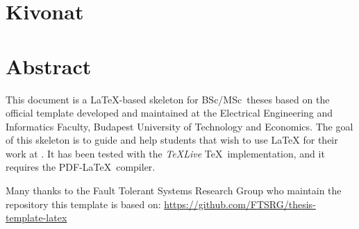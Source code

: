 \setcounter{page}{1}

\selecthungarian

\chapter*{Kivonat}

\vfill
\selectenglish


\chapter*{Abstract}

This document is a \LaTeX-based skeleton for BSc/MSc~theses based on the official template developed and maintained at the Electrical Engineering and Informatics Faculty, Budapest University of Technology and Economics. The goal of this skeleton is to guide and help students that wish to use \LaTeX{} for their work at \sze{} \givk. It has been tested with the \emph{TeXLive} \TeX~implementation, and it requires the PDF-\LaTeX~compiler.

Many thanks to the Fault Tolerant Systems Research Group who maintain the repository this template is based on: \url{https://github.com/FTSRG/thesis-template-latex}


\vfill
\selectthesislanguage

\setcounter{romanPage}{\value{page}}
